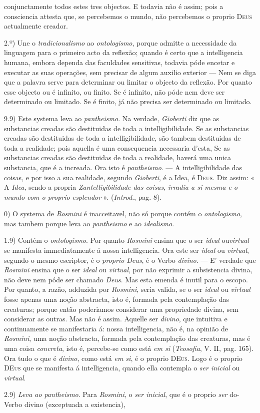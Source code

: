 conjunctamente todos estes tres objectos. E todavia não é assim; pois a consciencia attesta que, se percebemos o mundo, não percebemos o proprio \textsc{Deus} actualmente creador.\par 2.º) Une o \emph{tradicionalismo} ao \emph{ontologismo}, porque admitte a necessidade da linguagem para o primeiro acto da reflexão; quando é certo que a intelligencia humana, embora dependa das faculdades sensitivas, todavia póde encetar e executar as suas operações, sem precisar de algum auxilio exterior --- Nem se diga que a palavra serve para determinar ou limitar o objecto da reflexão. Por quanto esse objecto ou é infinito, ou finito. Se é infinito, não póde nem deve ser determinado ou limitado. Se é finito, já não precisa ser determinado ou limitado.\par 9.9) Este systema leva ao \emph{pantheismo}. Na verdade, \emph{Gioberti} diz que as substancias creadas são destituidas de toda a intelligibilidade. Se as substancias creadas são destituidas de toda a intelligibilidade, são tambem destituidas de toda a realidade; pois aquella é uma consequencia necessaria d'esta, Se as substancias creadas são destituidas de toda a realidade, haverá uma unica substancia, que é a increada. Ora isto é \emph{pantheismo}. --- A intelligibilidade das coisas, e por isso a sua realidade, segundo \emph{Gioberti}, é a Idea, é \textsc{Deus}. Diz assim: « A \emph{Idea}, sendo a propria \emph{Zantelligibilidade das coisas}, \emph{irradia a si mesma e o mundo com o proprio esplendor} ». (\emph{Introd}., pag. 8).\par 0) O systema de \emph{Rosmini} é inacceitavel, não só porque contém o \emph{ontologismo}, mas tambem porque leva ao \emph{pantheismo} e ao \emph{idealismo}.\par 1.9) Contém o \emph{ontologismo}. Por quanto \emph{Rosmini} ensina que o ser \emph{ideal} ou\emph{virtual} se manifesta immediatamente á nossa intelligencia. Ora este ser \emph{ideal} ou \emph{virtual}, segundo o mesmo escriptor, é o \emph{proprio Deus}, é o Verbo \emph{divino}. --- E' verdade que \emph{Rosmini} ensina que o ser \emph{ideal} ou \emph{virtual}, por não exprimir a subsistencia divina, não deve nem póde ser chamado \emph{Deus}. Mas esta emenda é inutil para o escopo. Por quanto, a razão, adduzida por \emph{Rosmini}, seria valida, se o ser \emph{ideal} ou \emph{virtual} fosse apenas uma noção abstracta, isto é, formada pela contemplação das creaturas; porque então poderiamos considerar uma propriedade divina, sem considerar as outras. Mas não é assim. Aquelle ser \emph{divino}, que intuitiva e continuamente se manifestaria á: nossa intelligencia, não é, na opinião de \emph{Rosmini}, uma noção abstracta, formada pela contemplação das creaturas, mas é uma coisa \emph{concreta}, isto é, percebe-se como está \emph{em si} (\emph{Teosofia}, V. II, pag. 165). Ora tudo o que é \emph{divino}, como está \emph{em si}, é o proprio \textsc{DEus}. Logo é o proprio \textsc{DEus} que se manifesta á intelligencia, quando ella contempla o \emph{ser inicial} ou \emph{virtual}.\par 2.9) \emph{Leva ao pantheismo}. Para \emph{Rosmini}, o \emph{ser inicial}, que é o proprio \emph{ser} do-Verbo divino (exceptuada a existencia), 
